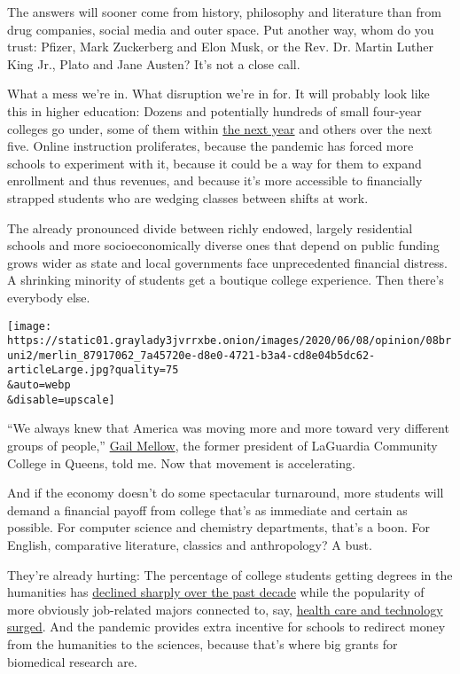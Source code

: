 The answers will sooner come from history, philosophy and literature
than from drug companies, social media and outer space. Put another way,
whom do you trust: Pfizer, Mark Zuckerberg and Elon Musk, or the Rev.
Dr. Martin Luther King Jr., Plato and Jane Austen? It's not a close
call.

What a mess we're in. What disruption we're in for. It will probably
look like this in higher education: Dozens and potentially hundreds of
small four-year colleges go under, some of them within
\href{https://www.wsj.com/articles/coronavirus-pushes-colleges-to-the-breaking-point-forcing-hard-choices-about-education-11588256157}{the
next year} and others over the next five. Online instruction
proliferates, because the pandemic has forced more schools to experiment
with it, because it could be a way for them to expand enrollment and
thus revenues, and because it's more accessible to financially strapped
students who are wedging classes between shifts at work.

The already pronounced divide between richly endowed, largely
residential schools and more socioeconomically diverse ones that depend
on public funding grows wider as state and local governments face
unprecedented financial distress. A shrinking minority of students get a
boutique college experience. Then there's everybody else.

\texttt{[image: https://static01.graylady3jvrrxbe.onion/images/2020/06/08/opinion/08bruni2/merlin\_87917062\_7a45720e-d8e0-4721-b3a4-cd8e04b5dc62-articleLarge.jpg?quality=75\\\&auto=webp\\\&disable=upscale]}

``We always knew that America was moving more and more toward very
different groups of people,''
\href{https://www.suny.edu/sunycon/2016/speakers/gail-mellow/}{Gail
Mellow}, the former president of LaGuardia Community College in Queens,
told me. Now that movement is accelerating.

And if the economy doesn't do some spectacular turnaround, more students
will demand a financial payoff from college that's as immediate and
certain as possible. For computer science and chemistry departments,
that's a boon. For English, comparative literature, classics and
anthropology? A bust.

They're already hurting: The percentage of college students getting
degrees in the humanities has
\href{https://www.theatlantic.com/ideas/archive/2018/08/the-humanities-face-a-crisisof-confidence/567565/}{declined
sharply over the past decade} while the popularity of more obviously
job-related majors connected to, say,
\href{https://www.forbes.com/sites/michaeltnietzel/2019/01/07/whither-the-humanities-the-ten-year-trend-in-college-majors/\#4009403a64ad}{health
care and technology surged}. And the pandemic provides extra incentive
for schools to redirect money from the humanities to the sciences,
because that's where big grants for biomedical research are.

